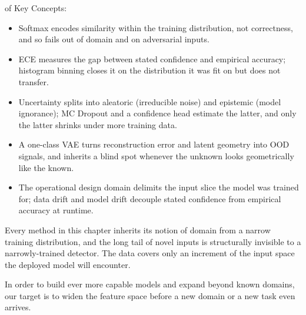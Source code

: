  of Key Concepts:
\begin{itemize}
    \item Softmax encodes similarity within the training distribution, not correctness, and so fails out of domain and on adversarial inputs.
    \item ECE measures the gap between stated confidence and empirical accuracy; histogram binning closes it on the distribution it was fit on but does not transfer.
    \item Uncertainty splits into aleatoric (irreducible noise) and epistemic (model ignorance); MC Dropout and a confidence head estimate the latter, and only the latter shrinks under more training data.
    \item A one-class VAE turns reconstruction error and latent geometry into OOD signals, and inherits a blind spot whenever the unknown looks geometrically like the known.
    \item The operational design domain delimits the input slice the model was trained for; data drift and model drift decouple stated confidence from empirical accuracy at runtime.
\end{itemize}


 Every method in this chapter inherits its notion of domain
from a narrow training distribution, and the long tail of novel inputs is structurally
invisible to a narrowly-trained detector. The data covers only an increment of the input
space the deployed model will encounter.

 In order to build ever more capable models and expand
beyond known domains, our target is to widen the feature space before a new domain or a
new task even arrives.


